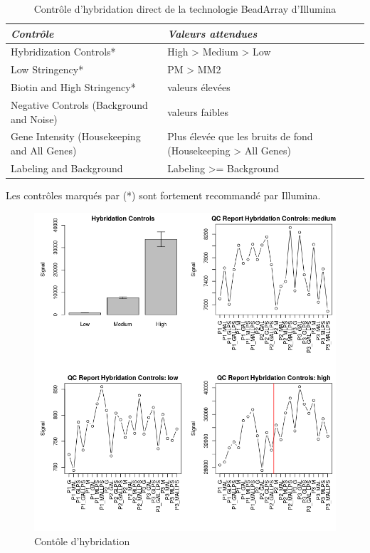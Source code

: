 \documentclass[a4paper,10pt]{article}
\begin{document}
\begin{table}[!ht]
\centering
\begin{tabular}{|p{3cm}|p{9cm}|}
\hline
 \emph{Contrôle} & \emph{Valeurs attendues}\\
\hline
Hybridization Controls*   &  High > Medium > Low \\
\hline 
Low Stringency* & PM > MM2\\
\hline
Biotin and High Stringency* & valeurs élevées\\
\hline
Negative Controls (Background and Noise) & valeurs faibles \\
\hline
Gene Intensity (Housekeeping and All Genes) & Plus élevée que les bruits de fond (Housekeeping > All Genes) \\
\hline
Labeling and Background & Labeling >= Background \\
\hline
\end{tabular}
\caption{Contrôle d'hybridation direct de la technologie BeadArray d'Illumina}
\label{Control Dyrect  Hyb}
Les contrôles marqués par (*) sont fortement recommandé par Illumina.
\end{table}
\begin{figure}
 \centering
 \includegraphics[scale=0.5]{../../R/output/hybControl.png}
 \caption{Contôle d'hybridation}
 \label{fig:hybControl}
\end{figure}
\end{document}
